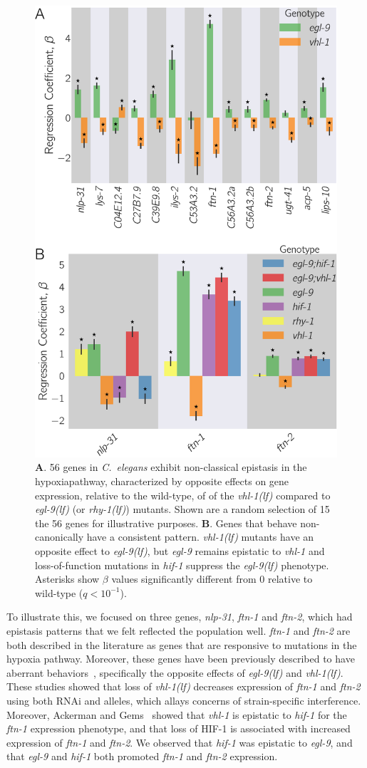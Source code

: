 \documentclass[10pt, onecolumn]{article}
\newcommand{\qval}[1]{$q<10^{-#1}$}
\newcommand{\cel}{\emph{C.~elegans}}
\newcommand{\gene}[1]{\emph{#1}}
\newcommand{\nlp}{\emph{\mbox{nlp-31}}}
\newcommand{\ftna}{\emph{\mbox{ftn-1}}}
\newcommand{\ftnb}{\emph{\mbox{ftn-2}}}
\newcommand{\egl}{\emph{\mbox{egl-9}(lf)}}
\newcommand{\rhy}{\emph{\mbox{rhy-1}(lf)}}
\newcommand{\vhl}{\emph{\mbox{vhl-1}(lf)}}
\newcommand{\hifp}{HIF-1}
\newcommand{\hifohtargets}{56}
\begin{document}
\begin{figure}[tbhp]
\centering
\includegraphics[width=.5\textwidth]{../figs/hif1oh_epistasis.pdf}
\caption{
\textbf{A}. \hifohtargets{} genes in \cel{} exhibit non-classical epistasis in
the hypoxiapathway, characterized by opposite effects on gene expression, relative
to the wild-type, of of the \vhl{} compared to \egl{} (or
\rhy{}) mutants. Shown are a random selection of 15 the \hifohtargets{} genes for
illustrative purposes.
\textbf{B}. Genes that behave non-canonically  have a consistent pattern. \vhl{}
mutants have an opposite effect to \egl{}, but \gene{egl-9} remains epistatic to
\gene{vhl-1} and loss-of-function mutations in \gene{hif-1} suppress the \egl{}
phenotype. Asterisks show $\beta$ values significantly different from 0 relative
to wild-type (\qval{1}).
}
\label{fig:hif1oh}
\end{figure}

To illustrate this, we focused on three genes, \nlp{}, \ftna{} and \ftnb{}, which
had epistasis patterns that we felt reflected the population well. \ftna{} and
\ftnb{} are both described in the literature as genes that are responsive to
mutations in the hypoxia pathway. Moreover, these genes have been previously
described to have aberrant behaviors~\cite{Ackerman2012,Romney2011}, specifically
the opposite effects of \egl{} and \vhl{}. These studies showed that loss of \vhl{}
decreases expression of \ftna{} and \ftnb{} using both RNAi and alleles, which
allays concerns of strain-specific interference. Moreover, Ackerman and
Gems~\cite{Ackerman2012} showed that \gene{vhl-1} is epistatic to \gene{hif-1}
for the \ftna{} expression phenotype, and that loss of \hifp{} is associated with
increased expression of \ftna{} and \ftnb{}. We observed that \gene{hif-1} was
epistatic to \gene{egl-9}, and that \gene{egl-9} and \gene{hif-1} both promoted
\ftna{} and \ftnb{} expression.
\end{document}
